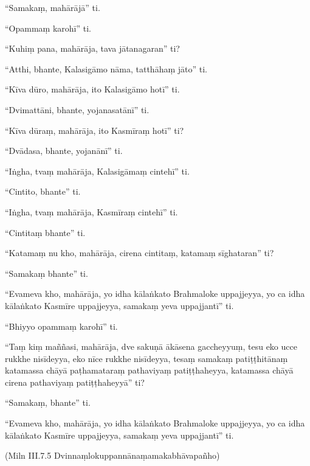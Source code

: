 “Samakaṃ, mahārājā” ti.

“Opammaṃ karohī” ti.

“Kuhiṃ pana, mahārāja, tava jātanagaran” ti?

“Atthi, bhante, Kalasigāmo nāma, tatthāhaṃ jāto” ti.

“Kīva dūro, mahārāja, ito Kalasigāmo hotī” ti.

“Dvimattāni, bhante, yojanasatānī” ti.

“Kīva dūraṃ, mahārāja, ito Kasmīraṃ hotī” ti?

“Dvādasa, bhante, yojanānī” ti.

“Iṅgha, tvaṃ mahārāja, Kalasigāmaṃ cintehī” ti.

“Cintito, bhante” ti.

“Iṅgha, tvaṃ mahārāja, Kasmīraṃ cintehī” ti.

“Cintitaṃ bhante” ti.

“Katamaṃ nu kho, mahārāja, cirena cintitaṃ, katamaṃ sīghataran” ti?

“Samakaṃ bhante” ti.

“Evameva kho, mahārāja, yo idha kālaṅkato Brahmaloke uppajjeyya, yo ca idha kālaṅkato Kasmīre uppajjeyya, samakaṃ yeva uppajjantī” ti.

“Bhiyyo opammaṃ karohī” ti.

“Taṃ kiṃ maññasi, mahārāja, dve sakuṇā ākāsena gaccheyyuṃ, tesu eko ucce rukkhe nisīdeyya, eko nīce rukkhe nisīdeyya, tesaṃ samakaṃ patiṭṭhitānaṃ katamassa chāyā paṭhamataraṃ pathaviyaṃ patiṭṭhaheyya, katamassa chāyā cirena pathaviyaṃ patiṭṭhaheyyā” ti?

“Samakaṃ, bhante” ti.

“Evameva kho, mahārāja, yo idha kālaṅkato Brahmaloke uppajjeyya, yo ca idha kālaṅkato Kasmīre uppajjeyya, samakaṃ yeva uppajjantī” ti.

(Miln III.7.5 Dvinnaṃlokuppannānaṃamakabhāvapañho)